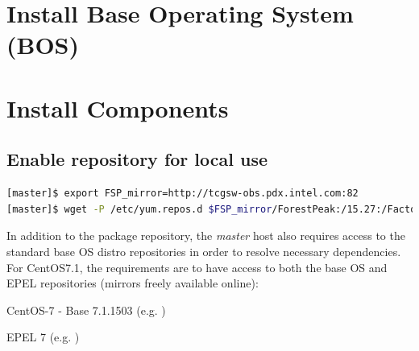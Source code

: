 \documentclass[letterpaper]{article}
\newcommand{\baseOS}{CentOS7.1}
\begin{document}






\section{Install Base Operating System (BOS)}



\section{Install \FSP{} Components} \label{sec:basic_install}


\subsection{Enable \FSP{} repository for local use} \label{sec:enable_repo}


\begin{lstlisting}[language=bash,keywords={}]
[master]$ export FSP_mirror=http://tcgsw-obs.pdx.intel.com:82
[master]$ wget -P /etc/yum.repos.d $FSP_mirror/ForestPeak:/15.27:/Factory/CentOS-7.1_Intel/ForestPeak:15.27:Factory.repo
\end{lstlisting}


In addition to the \FSP{} package repository, the {\em master} host also
requires access to the standard base OS distro repositories in order to resolve
necessary dependencies. For \baseOS{}, the requirements are to have access to
both the base OS and EPEL repositories (mirrors freely available online):

\begin{itemize*}
\item CentOS-7 - Base 7.1.1503
  (e.g. \href{http://mirror.centos.org/centos/7.1.1503/os/x86\_64}
             {\color{blue}{http://mirror.centos.org/centos/7.1.1503/os/x86\_64}} )
\item EPEL 7 (e.g. \href{http://download.fedoraproject.org/pub/epel/7/x86\_64}
                        {\color{blue}{http://download.fedoraproject.org/pub/epel/7/x86\_64}} )
\end{itemize*}
\end{document}
